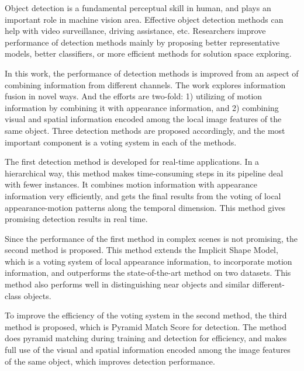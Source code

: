 \begin{eabstract}
Object detection is a fundamental perceptual skill in human, and plays an important role in machine vision area. Effective object detection methods can help with video surveillance, driving assistance, etc. Researchers improve performance of detection methods mainly by proposing better representative models, better classifiers, or more efficient methods for  solution space exploring.

In this work, the performance of detection methods is improved from an aspect of combining information from different channels. The work explores information fusion in novel ways. And the efforts are two-fold: 1) utilizing of motion information by combining it with appearance information, and 2) combining visual and spatial information encoded among the local image features of the same object. Three detection methods are proposed accordingly, and the most important component is a voting system in each of the methods.

The first detection method is developed for real-time applications. In a hierarchical way, this method makes time-consuming steps in its pipeline deal with fewer instances. It
combines motion information with appearance information very efficiently, and gets the final results from the voting of local appearance-motion patterns along the temporal dimension.  This method gives promising detection results in real time.

Since the performance of the first method in complex scenes is not promising, the second method is proposed. This method extends the Implicit Shape Model, which is a voting system of local appearance information, to incorporate motion information, and outperforms the state-of-the-art method on two datasets. This method also performs well in distinguishing near objects and similar different-class objects.


To improve the efficiency of the voting system in the second method, the third method is proposed, which is Pyramid Match Score for detection. The method does pyramid matching during training and detection for efficiency, and makes full use of the visual and spatial  information encoded among the image features of the same object, which improves detection performance.
\end{eabstract}



